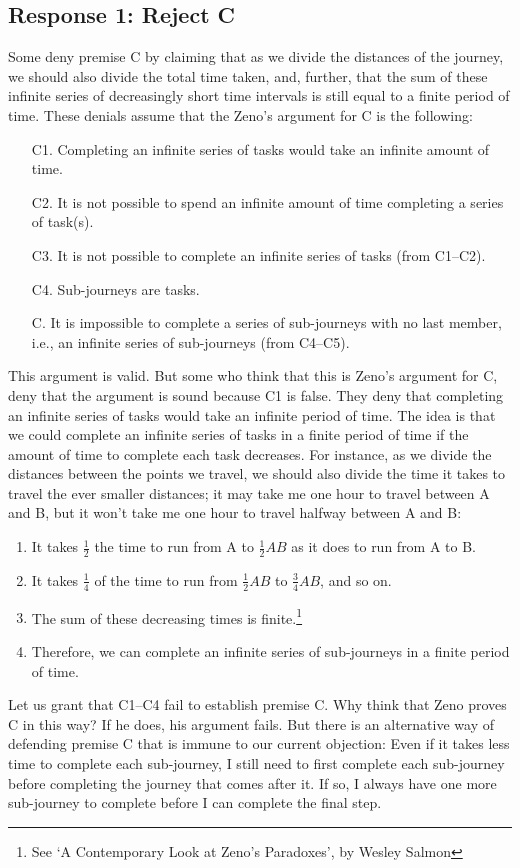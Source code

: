 \documentclass[oneside]{article}
\begin{document}
\subsection*{Response 1: Reject C}\label{response-1-reject-c}

Some deny premise C by claiming that as we divide the distances of the
journey, we should also divide the total time taken, and, further, that
the sum of these infinite series of decreasingly short time intervals is
still equal to a finite period of time. These denials assume that the
Zeno's argument for C is the following:

\begin{enumerate}
\item[C1.] Completing an infinite series of tasks would take an infinite
  amount of time.
\item[C2.] It is not possible to spend an infinite amount of time completing
 a series of task(s).
\item[C3.] It is not possible to complete an infinite series of
  tasks (from C1--C2).
 \item[C4.] Sub-journeys are tasks.
 \item[C.] It is impossible to complete a series of sub-journeys with no last
  member, i.e., an infinite series of sub-journeys (from C4--C5).
\end{enumerate}
This argument is valid.  But some who think that this is Zeno's argument for C, deny that the argument is sound because C1 is false. They deny that completing an infinite series of tasks would take an infinite period of time. The idea is that we could complete an infinite series of tasks in a finite period of time if the amount of time to complete each task decreases. For instance,  as we divide the distances between the
points we travel, we should also divide the time it takes to travel the ever smaller distances; it may take me one hour to travel between A and B, but it won't take me one hour to travel halfway between A and B:

\begin{enumerate}
\item
  It takes \(\frac{1}{2}\) the time to run from A to \(\frac{1}{2}AB\)
  as it does to run from A to B.
\item
  It takes \(\frac{1}{4}\) of the time to run from \(\frac{1}{2}AB\) to
  \(\frac{3}{4}AB\), and so on.
\item
  The sum of these decreasing times is finite.\footnote{See `A
    Contemporary Look at Zeno's Paradoxes', by Wesley Salmon}
\item
  Therefore, we can complete an infinite series of sub-journeys in a
  finite period of time.
\end{enumerate}
Let us grant that C1--C4 fail to establish premise C.  Why think that Zeno proves C in this way? If he does, his argument fails. But there is an
alternative way of defending premise C that is immune to our current objection:  Even if it takes less time to complete each sub-journey, I still need  to first complete each sub-journey before completing the journey that
  comes after it. If so, I always have one more sub-journey to complete
  before I can complete the final step.
\end{document}
